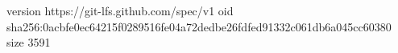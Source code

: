 version https://git-lfs.github.com/spec/v1
oid sha256:0acbfe0ec64215f0289516fe04a72dedbe26fdfed91332c061db6a045cc60380
size 3591
